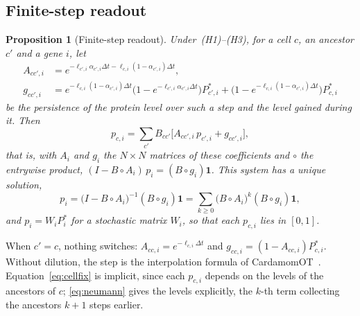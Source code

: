 \documentclass[a4paper, 11pt]{article}
\theoremstyle{plain}
\newtheorem{prop}{Proposition}
\theoremstyle{remark}
\begin{document}
\subsection{Finite-step readout}

\begin{prop}[Finite-step readout]\label{prop:finite}
Under~(H1)--(H3), for a cell $c$, an ancestor $c'$ and a gene $i$, let
\begin{align*}
A_{cc',i} &= e^{-\ell_{c',i}\alpha_{c',i}\Delta t - \ell_{c,i}(1-\alpha_{c',i})\Delta t},\\
g_{cc',i} &= e^{-\ell_{c,i}(1-\alpha_{c',i})\Delta t}\bigl(1 - e^{-\ell_{c',i}\alpha_{c',i}\Delta t}\bigr)P^\ast_{c',i} + \bigl(1 - e^{-\ell_{c,i}(1-\alpha_{c',i})\Delta t}\bigr)P^\ast_{c,i}
\end{align*}
be the persistence of the protein level over such a step and the level gained during it. Then
\begin{equation}\label{eq:cellfix}
p_{c,i} = \sum_{c'} B_{cc'}\bigl[A_{cc',i}\,p_{c',i} + g_{cc',i}\bigr],
\end{equation}
that is, with $A_i$ and $g_i$ the $N\times N$ matrices of these coefficients and $\circ$ the entrywise product, $(I - B\circ A_i)\,p_i = (B\circ g_i)\mathbf{1}$. This system has a unique solution,
\begin{equation}\label{eq:neumann}
p_i = \bigl(I - B\circ A_i\bigr)^{-1}(B\circ g_i)\mathbf{1} = \sum_{k\geq 0}\bigl(B\circ A_i\bigr)^k(B\circ g_i)\mathbf{1},
\end{equation}
and $p_i = W_iP^\ast_i$ for a stochastic matrix $W_i$, so that each $p_{c,i}$ lies in $[0,1]$.
\end{prop}

When $c' = c$, nothing switches: $A_{cc,i} = e^{-\ell_{c,i}\Delta t}$ and $g_{cc,i} = (1 - A_{cc,i})P^\ast_{c,i}$. Without dilution, the step is the interpolation formula of CardamomOT~\cite[Appendix~A]{mauge2026cardamomot}. Equation~\eqref{eq:cellfix} is implicit, since each $p_{c,i}$ depends on the levels of the ancestors of $c$; \eqref{eq:neumann} gives the levels explicitly, the $k$-th term collecting the ancestors $k+1$ steps earlier.
\end{document}
